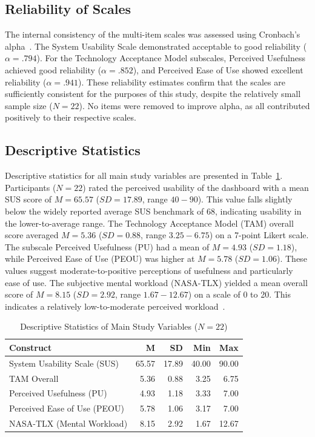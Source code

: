 \subsection{Reliability of Scales}
The internal consistency of the multi-item scales was assessed using Cronbach's alpha~\cite{cronbach1951coefficient}. The System Usability Scale demonstrated acceptable to good reliability ($\alpha = .794$). For the Technology Acceptance Model subscales, Perceived Usefulness achieved good reliability ($\alpha = .852$), and Perceived Ease of Use showed excellent reliability ($\alpha = .941$). These reliability estimates confirm that the scales are sufficiently consistent for the purposes of this study, despite the relatively small sample size ($N = 22$). No items were removed to improve alpha, as all contributed positively to their respective scales.

\subsection{Descriptive Statistics}
Descriptive statistics for all main study variables are presented in Table~\ref{tab:descriptive_stats}.
Participants ($N = 22$) rated the perceived usability of the dashboard with a mean SUS score of $M = 65.57$ ($SD = 17.89$, range $40-90$). This value falls slightly below the widely reported average SUS benchmark of 68, indicating usability in the lower-to-average range. The Technology Acceptance Model (TAM) overall score averaged $M = 5.36$ ($SD = 0.88$, range $3.25-6.75$) on a 7-point Likert scale. The subscale Perceived Usefulness (PU) had a mean of $M = 4.93$ ($SD = 1.18$), while Perceived Ease of Use (PEOU) was higher at $M = 5.78$ ($SD = 1.06$). These values suggest moderate-to-positive perceptions of usefulness and particularly ease of use.
The subjective mental workload (NASA-TLX) yielded a mean overall score of $M = 8.15$ ($SD = 2.92$, range $1.67-12.67$) on a scale of 0 to 20. This indicates a relatively low-to-moderate perceived workload~\cite{hertzum2021reference}. 
\begin{table}
  \centering
  \caption{Descriptive Statistics of Main Study Variables ($N=22$)}
  \label{tab:descriptive_stats}
  \small
  \begin{tabular}{l r r r r}
    \toprule
    \textbf{Construct} & \textbf{M} & \textbf{SD} & \textbf{Min} & \textbf{Max} \\
    \midrule
    System Usability Scale (SUS)   & 65.57 & 17.89 & 40.00 & 90.00 \\
    TAM Overall                    &  5.36 &  0.88 &  3.25 &  6.75 \\
    \quad Perceived Usefulness (PU)  &  4.93 &  1.18 &  3.33 &  7.00 \\
    \quad Perceived Ease of Use (PEOU) &  5.78 &  1.06 &  3.17 &  7.00 \\
    NASA-TLX (Mental Workload)     &  8.15 &  2.92 &  1.67 & 12.67 \\
    \bottomrule
  \end{tabular}
\end{table}

